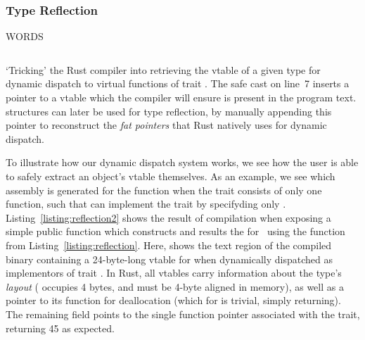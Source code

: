 \subsubsection{Type Reflection}
\label{type_reflection}
WORDS


\begin{listing}[ht]
	\centering
	\inputminted{rust}{reflection.rs}
	\caption[Tricking Rust into exposing a vtable.]{`Tricking' the Rust compiler into retrieving the vtable of a given type  for dynamic dispatch to virtual functions of trait . The safe cast on line~7 inserts a pointer to a vtable which the compiler will ensure is present in the program text.  structures can later be used for type reflection, by manually appending this pointer to reconstruct the \textit{fat pointers} that Rust natively uses for dynamic dispatch.}
	\label{listing:reflection}
\end{listing}

To illustrate how our dynamic dispatch system works, we see how the user is able to safely extract an object's vtable themselves. As an example, we see which assembly is generated for the  function when the trait  consists of only one function, such that  can implement the trait by specifyding only . Listing~\ref{listing:reflection2} shows the result of compilation when exposing a simple public function which constructs and results the  for~ using the function from Listing~\ref{listing:reflection}. Here,  shows the text region of the compiled binary containing a 24-byte-long vtable for  when dynamically dispatched as implementors of trait . In Rust, all vtables carry information about the type's \textit{layout} ( occupies 4 bytes, and must be 4-byte aligned in memory), as well as a pointer to its  function for deallocation (which for  is trivial, simply returning). The remaining field points to the single function pointer associated with the trait, returning 45 as expected.  

